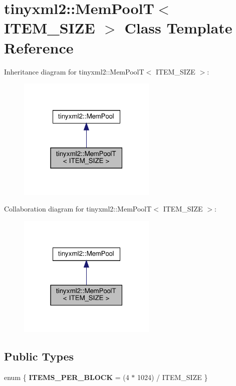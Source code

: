 \hypertarget{classtinyxml2_1_1_mem_pool_t}{}\section{tinyxml2\+:\+:Mem\+PoolT$<$ I\+T\+E\+M\+\_\+\+S\+I\+ZE $>$ Class Template Reference}
\label{classtinyxml2_1_1_mem_pool_t}


Inheritance diagram for tinyxml2\+:\+:Mem\+PoolT$<$ I\+T\+E\+M\+\_\+\+S\+I\+ZE $>$\+:
\nopagebreak
\begin{figure}[H]
\begin{center}
\leavevmode
\includegraphics[width=187pt]{classtinyxml2_1_1_mem_pool_t__inherit__graph}
\end{center}
\end{figure}


Collaboration diagram for tinyxml2\+:\+:Mem\+PoolT$<$ I\+T\+E\+M\+\_\+\+S\+I\+ZE $>$\+:
\nopagebreak
\begin{figure}[H]
\begin{center}
\leavevmode
\includegraphics[width=187pt]{classtinyxml2_1_1_mem_pool_t__coll__graph}
\end{center}
\end{figure}
\subsection*{Public Types}
\begin{DoxyCompactItemize}
\item 
\mbox{\label{classtinyxml2_1_1_mem_pool_t_a04cf45156e6f913f93972869ff8a1d94}} 
enum \{ {\bfseries I\+T\+E\+M\+S\+\_\+\+P\+E\+R\+\_\+\+B\+L\+O\+CK} = (4 $\ast$ 1024) / I\+T\+E\+M\+\_\+\+S\+I\+ZE
 \}
\end{DoxyCompactItemize}
